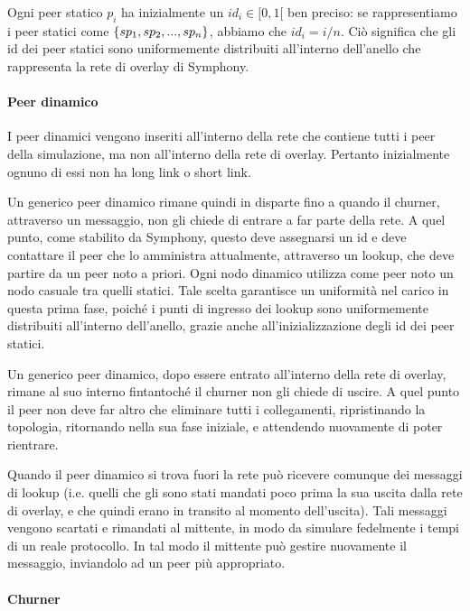 \documentclass[prodmode,acmtap]{acmlarge}
\begin{document}
Ogni peer statico $p_i$ ha inizialmente un $id_i \in [0,1[$ ben preciso: se rappresentiamo i peer statici come $\{sp_1, \linebreak[1] sp_2, \linebreak[1] ..., \linebreak[1] sp_n\}$, abbiamo che $id_i = i / n$. Ciò significa che gli id dei peer statici sono uniformemente distribuiti all'interno dell'anello che rappresenta la rete di overlay di Symphony.

\paragraph{Peer dinamico}
I peer dinamici vengono inseriti all'interno della rete che contiene tutti i peer della simulazione, ma non all'interno della rete di overlay. Pertanto inizialmente ognuno di essi non ha long link o short link. 

Un generico peer dinamico rimane quindi in disparte fino a quando il churner, attraverso un messaggio, non gli chiede di entrare a far parte della rete. A quel punto, come stabilito da Symphony, questo deve assegnarsi un id e deve contattare il peer che lo amministra attualmente, attraverso un lookup, che deve partire da un peer noto  a priori. Ogni nodo dinamico utilizza come peer noto un nodo casuale tra quelli statici. Tale scelta garantisce un uniformità nel carico in questa prima fase, poiché i punti di ingresso dei lookup sono uniformemente distribuiti all'interno dell'anello, grazie anche all'inizializzazione degli id dei peer statici.

Un generico peer dinamico, dopo essere entrato all'interno della rete di overlay, rimane al suo interno fintantoché il churner non gli chiede di uscire. A quel punto il peer non deve far altro che eliminare tutti i collegamenti, ripristinando la topologia, ritornando nella sua fase iniziale, e attendendo nuovamente di poter rientrare. 

Quando il peer dinamico si trova fuori la rete può ricevere comunque dei messaggi di lookup (i.e. quelli che gli sono stati mandati poco prima la sua uscita dalla rete di overlay, e che quindi erano in transito al momento dell'uscita). Tali messaggi vengono scartati e rimandati al mittente, in modo da simulare fedelmente i tempi di un reale protocollo. In tal modo il mittente può gestire nuovamente il messaggio, inviandolo ad un peer più appropriato.

\paragraph{Churner}
\end{document}
